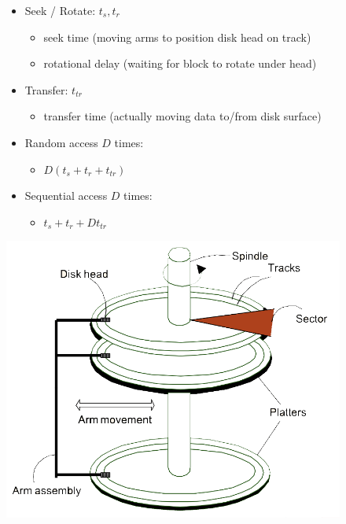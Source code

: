 \begin{figure}[H]
\begin{minipage}[t]{.5\textwidth}
\begin{itemize}
\item Seek / Rotate: $t_s, t_r$
\begin{itemize}
\item seek time (moving arms to position disk head on track)
\item rotational delay (waiting for block to rotate under head)
\end{itemize}
\item Transfer: $t_{tr}$
\begin{itemize}
\item transfer time (actually moving data to/from disk surface)
\end{itemize}
\item Random access $D$ times:
\begin{itemize}
\item $D(t_s + t_r + t_{tr})$
\end{itemize}
\item Sequential access $D$ times:
\begin{itemize}
\item $t_s + t_r + Dt_{tr}$
\end{itemize}
\end{itemize}
\end{minipage}
\begin{minipage}[t]{.5\textwidth}
\strut\vspace*{-\baselineskip}\newline
\centering
\includegraphics[width=\textwidth]{images/harddrive.PNG}
\label{harddrive}
\end{minipage}
\end{figure}


